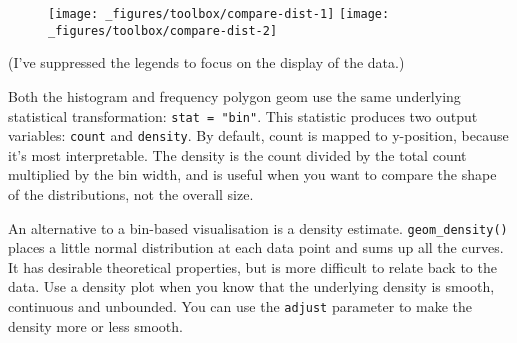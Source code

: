 \begin{figure}[H]
  \texttt{[image: \_figures/toolbox/compare-dist-1]}%
  \texttt{[image: \_figures/toolbox/compare-dist-2]}
\end{figure}

(I've suppressed the legends to focus on the display of the data.)

Both the histogram and frequency polygon geom use the same underlying
statistical transformation: \texttt{stat\ =\ "bin"}. This statistic
produces two output variables: \texttt{count} and \texttt{density}. By
default, count is mapped to y-position, because it's most interpretable.
The density is the count divided by the total count multiplied by the
bin width, and is useful when you want to compare the shape of the
distributions, not the overall size. 

An alternative to a bin-based visualisation is a density estimate.
\texttt{geom\_density()} places a little normal distribution at each
data point and sums up all the curves. It has desirable theoretical
properties, but is more difficult to relate back to the data. Use a
density plot when you know that the underlying density is smooth,
continuous and unbounded. You can use the \texttt{adjust} parameter to
make the density more or less smooth. 

\begin{Shaded}
\begin{Highlighting}[]
\StringTok{  }\NormalTok{(} \NormalTok{) +}\StringTok{ }
\StringTok{  }\NormalTok{(}\NormalTok{, }\NormalTok{) +}\StringTok{ }
\StringTok{  }\NormalTok{(} \NormalTok{)}
  
\StringTok{  }\NormalTok{(} \NormalTok{, } \NormalTok{) +}\StringTok{ }
\StringTok{  }\NormalTok{(}\NormalTok{, }\NormalTok{) +}\StringTok{ }
\StringTok{  }\NormalTok{(} \NormalTok{)}
\end{Highlighting}
\end{Shaded}

